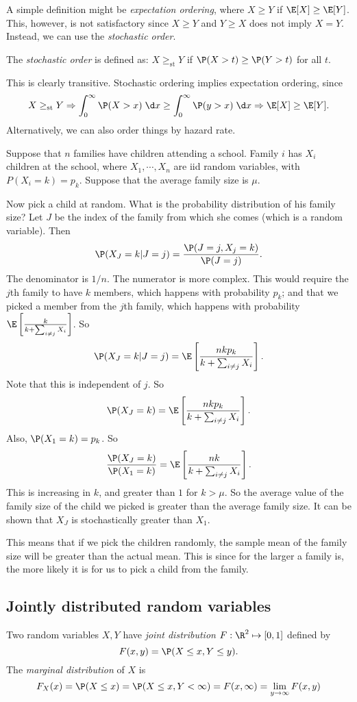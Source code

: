 \documentclass[a4paper]{article}
\begin{document}
A simple definition might be \emph{expectation ordering}, where $X \geq Y$ if $\E[X] \geq \E[Y]$. This, however, is not satisfactory since $X \geq Y$ and $Y \geq X$ does not imply $X = Y$. Instead, we can use the \emph{stochastic order}.
\begin{defi}
  The \emph{stochastic order} is defined as: $X \geq_{\mathrm{st}} Y$ if $\P(X > t) \geq \P(Y > t)$ for all $t$.
\end{defi}
This is clearly transitive. Stochastic ordering implies expectation ordering, since
\[
  X \geq_{\mathrm{st}} Y \Rightarrow  \int_0^\infty \P(X > x)\;\d x \geq \int_0^\infty \P(y > x)\;\d x \Rightarrow  \E[X] \geq \E[Y].
\]
Alternatively, we can also order things by hazard rate.
\begin{eg}
  Suppose that $n$ families have children attending a school. Family $i$ has $X_i$ children at the school, where $X_1, \cdots, X_n$ are iid random variables, with $P(X_i = k) = p_k$. Suppose that the average family size is $\mu$.

  Now pick a child at random. What is the probability distribution of his family size? Let $J$ be the index of the family from which she comes (which is a random variable). Then
  \[
    \P(X_J = k| J = j) = \frac{\P(J = j, X_j = k)}{\P(J = j)}.
  \]
  The denominator is $1/n$. The numerator is more complex. This would require the $j$th family to have $k$ members, which happens with probability $p_k$; and that we picked a member from the $j$th family, which happens with probability $\E\left[\frac{k}{k + \sum_{i \not=j} X_i}\right]$. So
  \[
    \P(X_J = k | J = j) = \E\left[\frac{nkp_k}{k + \sum_{i \not=j} X_i}\right].
  \]
  Note that this is independent of $j$. So
  \[
    \P(X_J = k) = \E\left[\frac{nkp_k}{k + \sum_{i \not=j} X_i}\right].
  \]
  Also, $\P(X_1 = k) = p_k$. So
  \[
    \frac{\P(X_J = k)}{\P(X_1 = k)} = \E\left[\frac{nk}{k + \sum_{i \not= j}X_i}\right].
  \]
  This is increasing in $k$, and greater than $1$ for $k > \mu$. So the average value of the family size of the child we picked is greater than the average family size. It can be shown that $X_J$ is stochastically greater than $X_1$.

  This means that if we pick the children randomly, the sample mean of the family size will be greater than the actual mean. This is since for the larger a family is, the more likely it is for us to pick a child from the family.
\end{eg}

\subsection{Jointly distributed random variables}
\begin{defi}
  Two random variables $X, Y$ have \emph{joint distribution} $F: \R^2 \mapsto [0, 1]$ defined by
  \[
    F(x, y) = \P(X \leq x, Y \leq y).
  \]
  The \emph{marginal distribution} of $X$ is
  \[
    F_X(x) = \P(X \leq x) = \P(X \leq x, Y < \infty) = F(x, \infty) = \lim_{y \to \infty}F(x, y)
  \]
\end{defi}
\end{document}
